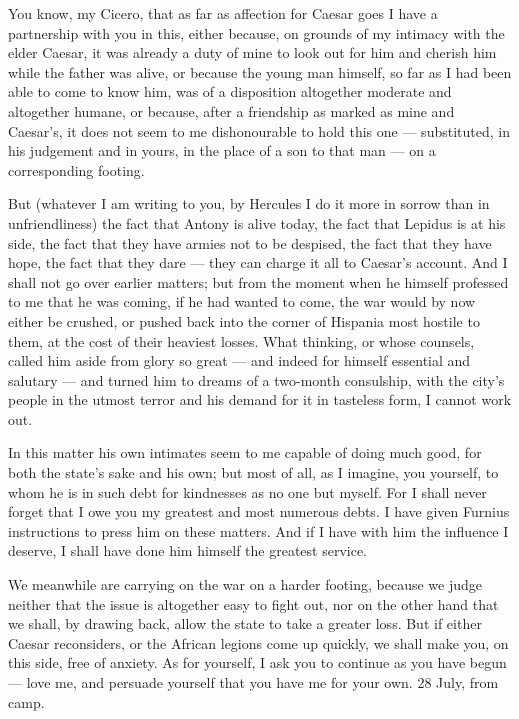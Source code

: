  You know, my Cicero, that as far as affection for Caesar goes I have a partnership with you in this, either because, on grounds of my intimacy with the elder Caesar, it was already a duty of mine to look out for him and cherish him while the father was alive, or because the young man himself, so far as I had been able to come to know him, was of a disposition altogether moderate and altogether humane, or because, after a friendship as marked as mine and Caesar's, it does not seem to me dishonourable to hold this one --- substituted, in his judgement and in yours, in the place of a son to that man --- on a corresponding footing.

 But (whatever I am writing to you, by Hercules I do it more in sorrow than in unfriendliness) the fact that Antony is alive today, the fact that Lepidus is at his side, the fact that they have armies not to be despised, the fact that they have hope, the fact that they dare --- they can charge it all to Caesar's account. And I shall not go over earlier matters; but from the moment when he himself professed to me that he was coming, if he had wanted to come, the war would by now either be crushed, or pushed back into the corner of Hispania most hostile to them, at the cost of their heaviest losses. What thinking, or whose counsels, called him aside from glory so great --- and indeed for himself essential and salutary --- and turned him to dreams of a two-month consulship, with the city's people in the utmost terror and his demand for it in tasteless form, I cannot work out.

 In this matter his own intimates seem to me capable of doing much good, for both the state's sake and his own; but most of all, as I imagine, you yourself, to whom he is in such debt for kindnesses as no one but myself. For I shall never forget that I owe you my greatest and most numerous debts. I have given Furnius instructions to press him on these matters. And if I have with him the influence I deserve, I shall have done him himself the greatest service.

 We meanwhile are carrying on the war on a harder footing, because we judge neither that the issue is altogether easy to fight out, nor on the other hand that we shall, by drawing back, allow the state to take a greater loss. But if either Caesar reconsiders, or the African legions come up quickly, we shall make you, on this side, free of anxiety. As for yourself, I ask you to continue as you have begun --- love me, and persuade yourself that you have me for your own. 28 July, from camp.
